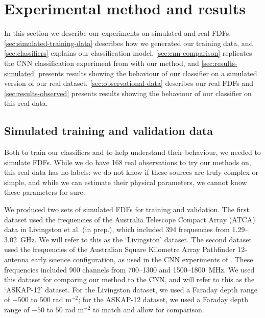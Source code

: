 \section{Experimental method and results}
\label{sec:faraday-experiment-classification}

  In this section we describe our experiments on simulated and real FDFs. \autoref{sec:simulated-training-data} describes how we generated our training data, and \autoref{sec:classifiers} explains our classification model. \autoref{sec:cnn-comparison} replicates the CNN classification experiment from \citet{brown_classifying_2018} with our method, and \autoref{sec:results-simulated} presents results showing the behaviour of our classifier on a simulated version of our real dataset. \autoref{sec:observational-data} describes our real FDFs and \autoref{sec:results-observed} presents results showing the behaviour of our classifier on this real data.

  \subsection{Simulated training and validation data}
  \label{sec:faraday-simulated-training-data}

    Both to train our classifiers and to help understand their behaviour, we needed to simulate FDFs. While we do have 168 real observations to try our methods on, this real data has no labels: we do not know if these sources are truly complex or simple, and while we can estimate their physical parameters, we cannot know these parameters for sure.

    We produced two sets of simulated FDFs for training and validation. The first dataset used the frequencies of the Australia Telescope Compact Array (ATCA) data in Livingston et al. (in prep.), which included 394 frequencies from 1.29--3.02~GHz. We will refer to this as the `Livingston' dataset. The second dataset used the frequencies of the Australian Square Kilometre Array Pathfinder 12-antenna early science configuration, as used in the CNN experiments of \citet{brown_classifying_2018}. These frequencies included 900 channels from 700--1300 and 1500--1800~MHz. We used this dataset for comparing our method to the CNN, and will refer to this as the `ASKAP-12' dataset. For the Livingston dataset, we used a Faraday depth range of $-500$ to $500$ rad m$^{-2}$; for the ASKAP-12 dataset, we used a Faraday depth range of $-50$ to $50$ rad m$^{-2}$ to match \citet{brown_classifying_2018} and allow for comparison.

